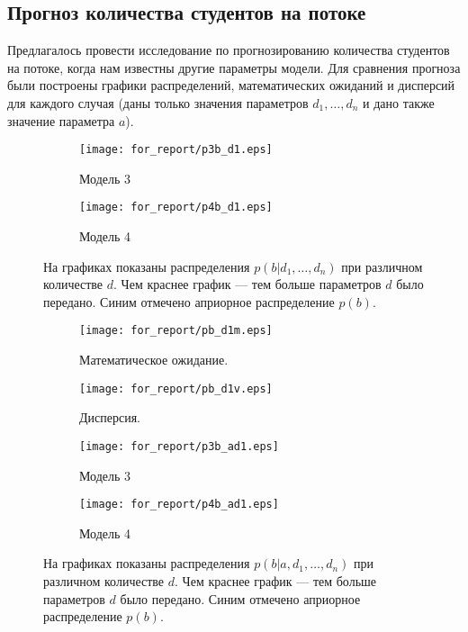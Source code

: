 \documentclass[12pt,a4paper]{article}
\begin{document}
\subsection{Прогноз количества студентов на потоке}

Предлагалось провести исследование по прогнозированию количества студентов на потоке, когда нам известны другие параметры модели.
Для сравнения прогноза были построены графики распределений, математических ожиданий и дисперсий для каждого случая (даны только значения параметров $d_1, \dots, d_n$ и дано также значение параметра $a$).

\begin{figure}[p]
  \centering
  \begin{subfigure}[b]{0.48\textwidth}
    \centering
    \texttt{[image: for\_report/p3b\_d1.eps]}
    \label{fig:p3b_d1}
    \caption{Модель 3}
  \end{subfigure}
  \begin{subfigure}[b]{0.48\textwidth}
    \centering
    \texttt{[image: for\_report/p4b\_d1.eps]}
    \label{fig:p4b_d1}
    \caption{Модель 4}
  \end{subfigure}
  \label{fig:pb_d1}
  \caption{На графиках показаны распределения $p(b|d_1,\dots,d_n)$ при различном количестве $d$. Чем краснее график --- тем больше параметров $d$ было передано. Синим отмечено априорное распределение $p(b)$.}
\end{figure}

\begin{figure}[p]
  \centering
  \begin{subfigure}[b]{0.48\textwidth}
    \centering
    \texttt{[image: for\_report/pb\_d1m.eps]}
    \label{fig:pb_d1m}
    \caption{Математическое ожидание.}
  \end{subfigure}
  \begin{subfigure}[b]{0.48\textwidth}
    \centering
    \texttt{[image: for\_report/pb\_d1v.eps]}
    \label{fig:pb_d1v}
    \caption{Дисперсия.}
  \end{subfigure}
  \label{fig:pb_d1mv}
  \caption{}
\end{figure}

\begin{figure}[p]
  \centering
  \begin{subfigure}[b]{0.48\textwidth}
    \centering
    \texttt{[image: for\_report/p3b\_ad1.eps]}
    \label{fig:p3b_ad1}
    \caption{Модель 3}
  \end{subfigure}
  \begin{subfigure}[b]{0.48\textwidth}
    \centering
    \texttt{[image: for\_report/p4b\_ad1.eps]}
    \label{fig:p4b_ad1}
    \caption{Модель 4}
  \end{subfigure}
  \label{fig:pb_ad1}
  \caption{На графиках показаны распределения $p(b|a,d_1,\dots,d_n)$ при различном количестве $d$. Чем краснее график --- тем больше параметров $d$ было передано. Синим отмечено априорное распределение $p(b)$.}
\end{figure}
\end{document}
